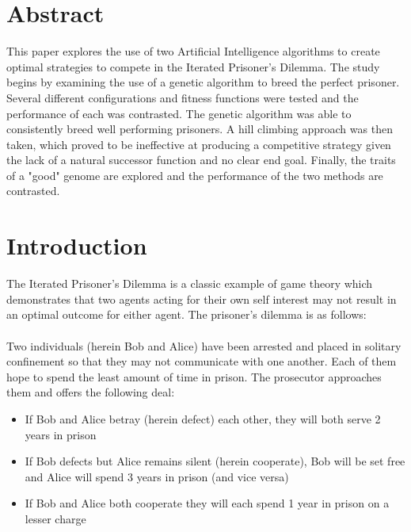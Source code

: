 \documentclass[12pt]{article}
\begin{document}
\maketitle

\pagebreak
\tableofcontents
\pagebreak

\section{Abstract}

This paper explores the use of two Artificial Intelligence algorithms to
create optimal strategies to compete in the Iterated Prisoner's Dilemma.  The
study begins by examining the use of a genetic algorithm to breed the perfect
prisoner.  Several different configurations and fitness functions were tested and
the performance of each was contrasted.  The genetic algorithm was able to
consistently breed well performing prisoners.
A hill climbing approach was then taken,
which proved to be ineffective at producing a competitive strategy given the
lack of a natural successor function and no clear end goal.  Finally, the traits
of a "good" genome are explored and the performance of the two methods are contrasted.

\pagebreak

\section{Introduction}
The Iterated Prisoner's Dilemma is a classic example of game theory which demonstrates
that two agents acting for their own self interest may not result in an
optimal outcome for either agent.  The prisoner's
dilemma is as follows: \\ \\
Two individuals (herein Bob and Alice) have been arrested and placed in solitary
confinement so that they may not communicate with one another.  Each of them hope
to spend the least amount of time in prison.  The prosecutor approaches them
and offers the following deal:
\begin{itemize}
    \item If Bob and Alice betray (herein defect) each other, they will
        both serve 2 years in prison
    \item If Bob defects but Alice remains silent (herein cooperate), Bob
        will be set free and Alice will spend 3 years in prison (and vice versa)
    \item If Bob and Alice both cooperate they will each spend 1 year in prison
        on a lesser charge \\
\end{itemize}
\end{document}
